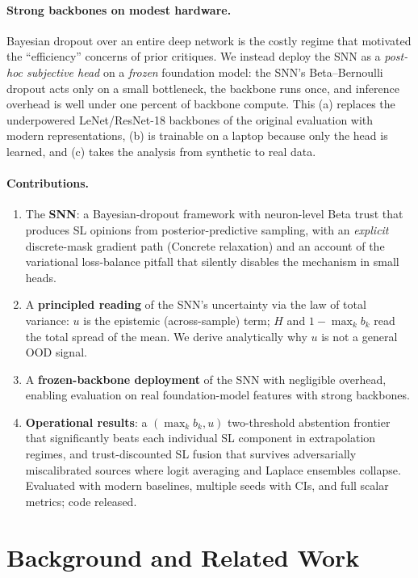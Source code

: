 \documentclass[11pt]{article}
\begin{document}
\paragraph{Strong backbones on modest hardware.}
Bayesian dropout over an entire deep network is the costly regime that motivated the
``efficiency'' concerns of prior critiques. We instead deploy the SNN as a
\emph{post-hoc subjective head} on a \emph{frozen} foundation model: the SNN's
Beta--Bernoulli dropout acts only on a small bottleneck, the backbone runs once, and
inference overhead is well under one percent of backbone compute. This (a) replaces the
underpowered LeNet/ResNet-18 backbones of the original evaluation with modern
representations, (b) is trainable on a laptop because only the head is learned, and
(c) takes the analysis from synthetic to real data.

\paragraph{Contributions.}
\begin{enumerate}
\item The \textbf{SNN}: a Bayesian-dropout framework with neuron-level Beta trust that
produces SL opinions from posterior-predictive sampling, with an \emph{explicit}
discrete-mask gradient path (Concrete relaxation) and an account of the variational
loss-balance pitfall that silently disables the mechanism in small heads.
\item A \textbf{principled reading} of the SNN's uncertainty via the law of total
variance: $u$ is the epistemic (across-sample) term; $H$ and $1-\max_k b_k$ read the
total spread of the mean. We derive analytically why $u$ is not a general OOD signal.
\item A \textbf{frozen-backbone deployment} of the SNN with negligible overhead,
enabling evaluation on real foundation-model features with strong backbones.
\item \textbf{Operational results}: a $(\max_k b_k, u)$ two-threshold abstention
frontier that significantly beats each individual SL component in extrapolation regimes,
and trust-discounted SL fusion that survives adversarially miscalibrated sources where
logit averaging and Laplace ensembles collapse. Evaluated with modern baselines,
multiple seeds with CIs, and full scalar metrics; code released.
\end{enumerate}

\section{Background and Related Work}
\end{document}

